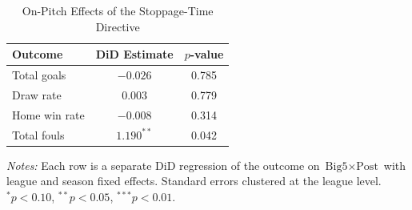 \begin{table}[t]
\centering
\caption{On-Pitch Effects of the Stoppage-Time Directive}
\label{tab:onpitch}
\small
\begin{tabular}{lcc}
\toprule
Outcome & DiD Estimate & $p$-value \\
\midrule
Total goals & $-0.026$ & 0.785 \\
Draw rate & $0.003$ & 0.779 \\
Home win rate & $-0.008$ & 0.314 \\
Total fouls & $1.190^{**}$ & 0.042 \\
\bottomrule
\end{tabular}
\begin{tablenotes}\small
\item \textit{Notes:} Each row is a separate DiD regression of the outcome on $\text{Big5} \times \text{Post}$ with league and season fixed effects. Standard errors clustered at the league level. $^{*}p<0.10$, $^{**}p<0.05$, $^{***}p<0.01$.
\end{tablenotes}
\end{table}
